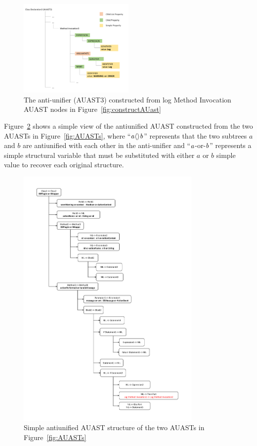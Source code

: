 \begin{figure} [H]
  \centering\includegraphics [width = 0.5\textwidth, height = 0.35\textheight]
  {Drawing4/structureAU.pdf}
  \caption{The anti-unifier (AUAST3) constructed from log Method Invocation AUAST nodes in Figure~\ref{fig:constructAUast} }
  \label{fig:AUAUAST}
\end{figure}

Figure~\ref{fig:meth-anti-unifier} shows a simple view of the antiunified AUAST constructed from the two AUASTs in Figure~\ref{fig:AUASTs}, where ``$\mathit{a}\langle\rangle\mathit{b}$'' represents that the two subtrees $a$ and $b$ are antiunified with each other in the anti-unifier and ``$\mathit{a}$-or-$\mathit{b}$'' represents a simple structural variable that must be substituted with either $a$ or $b$ simple value to recover each original structure.


\begin{figure} [H]
  \centering\includegraphics [width = 0.8\textwidth, height = 0.9\textheight]{Drawing4/anti-unifier.pdf}
  \caption{Simple antiunified AUAST structure of the two  AUASTs in Figure~\ref{fig:AUASTs}}
  \label{fig:meth-anti-unifier}
\end{figure}
